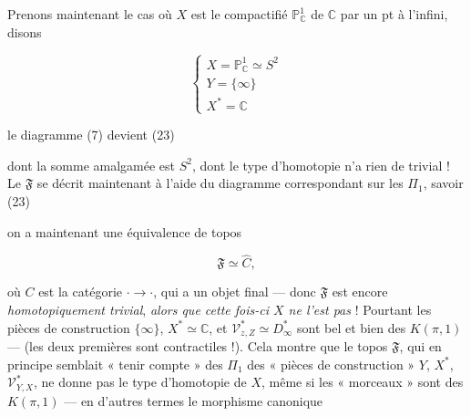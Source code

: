 \documentclass[11pt,a4paper]{article}
\begin{document}
Prenons maintenant le cas où $X$ est le compactifié $\mathbb{P}^1_{\mathbb{C}}$
de $\mathbb{C}$ par un pt à l'infini,  disons

\[
  \begin{cases}
    X = \mathbb{P}^1_{\mathbb{C}} \simeq S^2 \\
    Y = \{\infty\} \\
    X^{*} = \mathbb{C}
  \end{cases}
\]

le diagramme (7) devient (23)


dont la somme amalgamée est $S^2$, dont le type d'homotopie n'a rien de
trivial ! Le  $\mathfrak{F}$ se décrit maintenant à l'aide du
diagramme correspondant sur les $\Pi_1$, savoir  (23)



on a maintenant une équivalence de topos

\[
  \mathfrak{F} \simeq \widehat{C} ,
\]

où $C$ est la catégorie ${\cdot} \to {\cdot}$, qui a un objet final — donc
$\mathfrak{F}$ est encore \emph{homotopiquement trivial}, \emph{alors que cette
fois-ci $X$ ne l'est pas} ! Pourtant les pièces de construction
$\{\infty\}$, $X^{*} \simeq \mathbb{C}$, et
$\mathcal{V}^{*}_{z,Z} \simeq D^{*}_{\infty}$ sont bel et bien des $K(\pi,1)$ —
(les deux premières sont contractiles !). Cela montre que le topos
$\mathfrak{F}$, qui en principe semblait « tenir compte » des $\Pi_1$ des
« pièces de construction » $Y$, $X^{*}$, $\mathcal{V}^{*}_{Y,X}$, ne
donne pas  le type d'homotopie de $X$, même si les « morceaux » sont des
$K(\pi,1)$ — en d'autres termes le morphisme canonique
\end{document}
